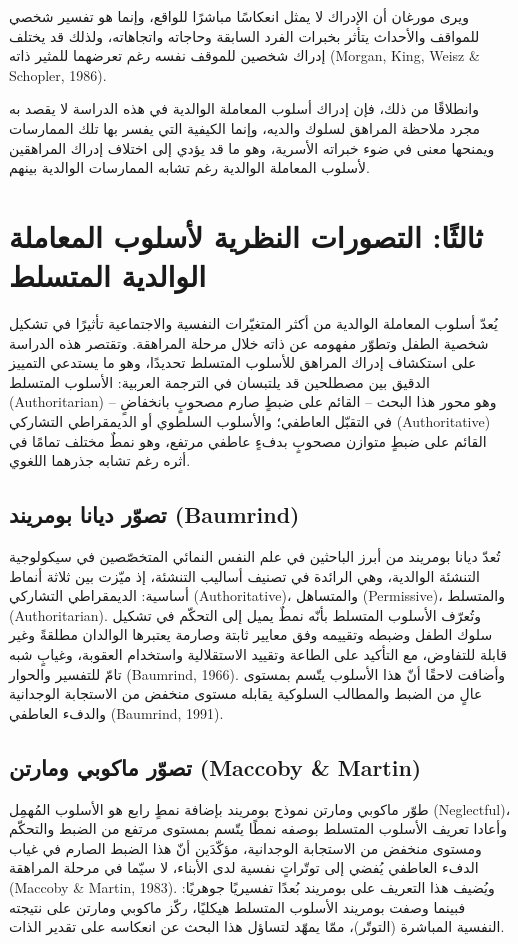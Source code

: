 \documentclass[12pt,oneside]{report}
\newcommand{\en}[1]{\textenglish{#1}}
\begin{document}
ويرى مورغان أن الإدراك لا يمثل انعكاسًا مباشرًا للواقع، وإنما هو تفسير شخصي للمواقف والأحداث يتأثر بخبرات الفرد السابقة وحاجاته واتجاهاته، ولذلك قد يختلف إدراك شخصين للموقف نفسه رغم تعرضهما للمثير ذاته (Morgan, King, Weisz \& Schopler, 1986).

وانطلاقًا من ذلك، فإن إدراك أسلوب المعاملة الوالدية في هذه الدراسة لا يقصد به مجرد ملاحظة المراهق لسلوك والديه، وإنما الكيفية التي يفسر بها تلك الممارسات ويمنحها معنى في ضوء خبراته الأسرية، وهو ما قد يؤدي إلى اختلاف إدراك المراهقين لأسلوب المعاملة الوالدية رغم تشابه الممارسات الوالدية بينهم.

\section{ثالثًا: التصورات النظرية لأسلوب المعاملة الوالدية المتسلط}
يُعدّ أسلوب المعاملة الوالدية من أكثر المتغيّرات النفسية والاجتماعية تأثيرًا في تشكيل شخصية الطفل
وتطوّر مفهومه عن ذاته خلال مرحلة المراهقة. وتقتصر هذه الدراسة على استكشاف إدراك المراهق للأسلوب
المتسلط تحديدًا، وهو ما يستدعي التمييز الدقيق بين مصطلحين قد يلتبسان في الترجمة العربية: الأسلوب
المتسلط \en{(Authoritarian)} -- وهو محور هذا البحث -- القائم على ضبطٍ صارم مصحوبٍ بانخفاضٍ في
التقبّل العاطفي؛ والأسلوب السلطوي أو الديمقراطي التشاركي \en{(Authoritative)} القائم على ضبطٍ
متوازن مصحوبٍ بدفءٍ عاطفي مرتفع، وهو نمطٌ مختلف تمامًا في أثره رغم تشابه جذرهما اللغوي.

\subsection{تصوّر ديانا بومريند (Baumrind)}
تُعدّ ديانا بومريند من أبرز الباحثين في علم النفس النمائي المتخصّصين في سيكولوجية التنشئة الوالدية،
وهي الرائدة في تصنيف أساليب التنشئة، إذ ميّزت بين ثلاثة أنماط أساسية: الديمقراطي التشاركي
\en{(Authoritative)}، والمتساهل \en{(Permissive)}، والمتسلط \en{(Authoritarian)}. وتُعرّف الأسلوب
المتسلط بأنّه نمطٌ يميل إلى التحكّم في تشكيل سلوك الطفل وضبطه وتقييمه وفق معايير ثابتة وصارمة
يعتبرها الوالدان مطلقةً وغير قابلة للتفاوض، مع التأكيد على الطاعة وتقييد الاستقلالية واستخدام العقوبة،
وغيابٍ شبه تامّ للتفسير والحوار \en{(Baumrind, 1966)}. وأضافت لاحقًا أنّ هذا الأسلوب يتّسم بمستوى
عالٍ من الضبط والمطالب السلوكية يقابله مستوى منخفض من الاستجابة الوجدانية والدفء العاطفي
\en{(Baumrind, 1991)}.

\subsection{تصوّر ماكوبي ومارتن (Maccoby \& Martin)}
طوّر ماكوبي ومارتن نموذج بومريند بإضافة نمطٍ رابع هو الأسلوب المُهمِل \en{(Neglectful)}، وأعادا
تعريف الأسلوب المتسلط بوصفه نمطًا يتّسم بمستوى مرتفع من الضبط والتحكّم ومستوى منخفض من
الاستجابة الوجدانية، مؤكّدَين أنّ هذا الضبط الصارم في غياب الدفء العاطفي يُفضي إلى توتّراتٍ نفسية
لدى الأبناء، لا سيّما في مرحلة المراهقة \en{(Maccoby \& Martin, 1983)}. ويُضيف هذا التعريف على
بومريند بُعدًا تفسيريًا جوهريًا: فبينما وصفت بومريند الأسلوب المتسلط هيكليًا، ركّز ماكوبي ومارتن على
نتيجته النفسية المباشرة (التوتّر)، ممّا يمهّد لتساؤل هذا البحث عن انعكاسه على تقدير الذات.
\end{document}
